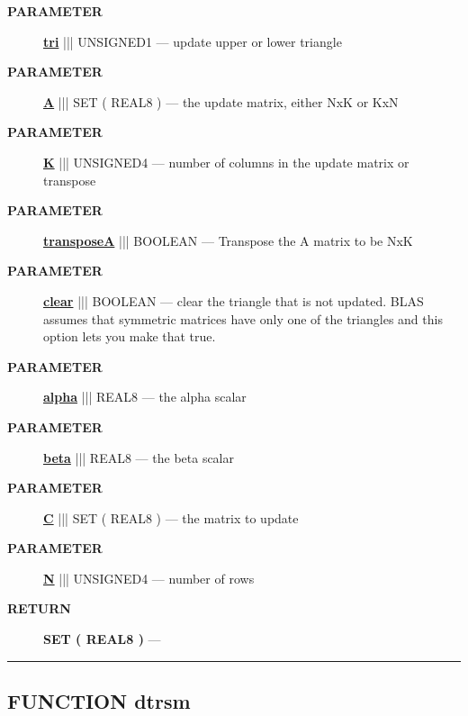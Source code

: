 \par
\begin{description}
\item [\colorbox{tagtype}{\color{white} \textbf{\textsf{PARAMETER}}}] \textbf{\underline{tri}} ||| UNSIGNED1 --- update upper or lower triangle
\item [\colorbox{tagtype}{\color{white} \textbf{\textsf{PARAMETER}}}] \textbf{\underline{A}} ||| SET ( REAL8 ) --- the update matrix, either NxK or KxN
\item [\colorbox{tagtype}{\color{white} \textbf{\textsf{PARAMETER}}}] \textbf{\underline{K}} ||| UNSIGNED4 --- number of columns in the update matrix or transpose
\item [\colorbox{tagtype}{\color{white} \textbf{\textsf{PARAMETER}}}] \textbf{\underline{transposeA}} ||| BOOLEAN --- Transpose the A matrix to be NxK
\item [\colorbox{tagtype}{\color{white} \textbf{\textsf{PARAMETER}}}] \textbf{\underline{clear}} ||| BOOLEAN --- clear the triangle that is not updated. BLAS assumes that symmetric matrices have only one of the triangles and this option lets you make that true.
\item [\colorbox{tagtype}{\color{white} \textbf{\textsf{PARAMETER}}}] \textbf{\underline{alpha}} ||| REAL8 --- the alpha scalar
\item [\colorbox{tagtype}{\color{white} \textbf{\textsf{PARAMETER}}}] \textbf{\underline{beta}} ||| REAL8 --- the beta scalar
\item [\colorbox{tagtype}{\color{white} \textbf{\textsf{PARAMETER}}}] \textbf{\underline{C}} ||| SET ( REAL8 ) --- the matrix to update
\item [\colorbox{tagtype}{\color{white} \textbf{\textsf{PARAMETER}}}] \textbf{\underline{N}} ||| UNSIGNED4 --- number of rows
\end{description}







\par
\begin{description}
\item [\colorbox{tagtype}{\color{white} \textbf{\textsf{RETURN}}}] \textbf{SET ( REAL8 )} --- 
\end{description}




\rule{\linewidth}{0.5pt}
\subsection*{\textsf{\colorbox{headtoc}{\color{white} FUNCTION}
dtrsm}}


